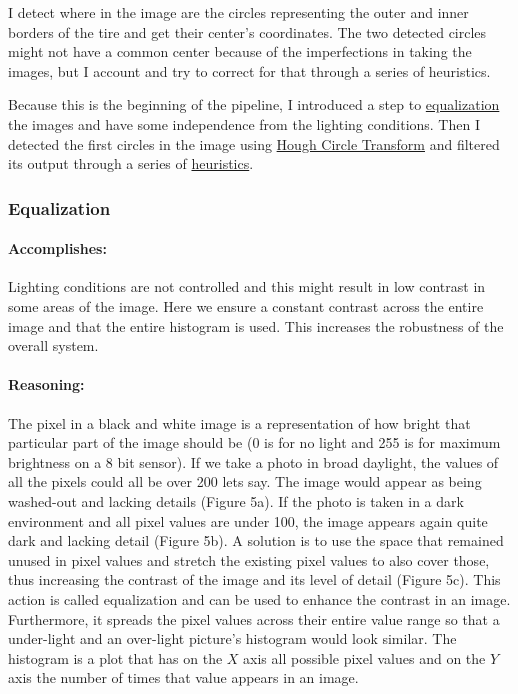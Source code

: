 I detect where in the image are the circles representing the outer and inner borders of the tire and get their center's coordinates. The two detected circles might not have a common center because of the imperfections in taking the images, but I account and try to correct for that through a series of heuristics.

Because this is the beginning of the pipeline, I introduced a step to \hyperref[subsubsec:equalization]{equalization} the images and have some independence from the lighting conditions. Then I detected the first circles in the image using \hyperref[subsubsec:hough_circles_transform]{Hough Circle Transform} and filtered its output through a series of \hyperref[subsubsec:circ_det_heuristics]{heuristics}.

\subsubsection{Equalization}
\label{subsubsec:equalization}

\paragraph*{Accomplishes:}\mbox{}\par
Lighting conditions are not controlled and this might result in low contrast in some areas of the image. Here we ensure a constant contrast across the entire image and that the entire histogram is used. This increases the robustness of the overall system.

\paragraph*{Reasoning:}\mbox{}\par
The pixel in a black and white image is a representation of how bright that particular part of the image should be (0 is for no light and 255 is for maximum brightness on a 8 bit sensor). If we take a photo in broad daylight, the values of all the pixels could all be over 200 lets say. The image would appear as being washed-out and lacking details (Figure 5a). If the photo is taken in a dark environment and all pixel values are under 100, the image appears again quite dark and lacking detail (Figure 5b). A solution is to use the space that remained unused in pixel values and stretch the existing pixel values to also cover those, thus increasing the contrast of the image and its level of detail (Figure 5c). This action is called equalization and can be used to enhance the contrast in an image. Furthermore, it spreads the pixel values across their entire value range so that a under-light and an over-light picture's histogram would look similar. The histogram is a plot that has on the $X$ axis all possible pixel values and on the $Y$ axis the number of times that value appears in an image.

